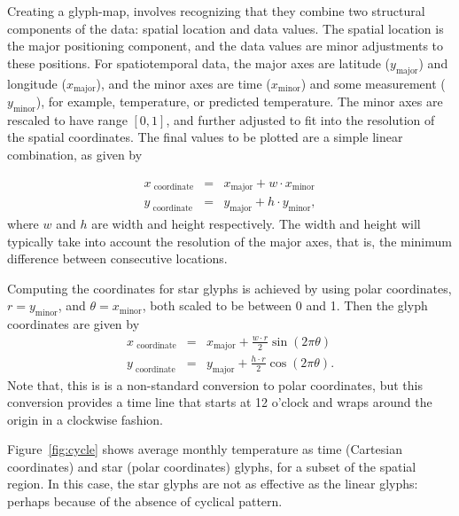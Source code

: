 \documentclass[oneside]{article}
\newcommand\amin{\text{minor}}
\newcommand\amaj{\text{major}}
\begin{document}
Creating a glyph-map, involves recognizing that they combine two structural components of the data: spatial location and data values. The spatial location is the major positioning component, and the data values are minor adjustments to these positions. For spatiotemporal data, the major axes are latitude ($y_{\amaj}$) and longitude ($x_{\amaj}$), and the minor axes are time ($x_{\amin}$) and some measurement ($y_{\amin}$), for example, temperature, or predicted temperature. The minor axes are rescaled to have range $[0, 1]$, and further adjusted to fit into the resolution of the spatial coordinates. The final values to be plotted are a simple linear combination, as given by 

\begin{equation}
\begin{array}{lll}
x_\text{ coordinate}&=& x_{\amaj} + w \cdot x_{\amin}\\
y_\text{ coordinate}&=& y_{\amaj} + h \cdot y_{\amin}, 
\end{array}\label{coords.eqn}
\end{equation}
where $w$ and $h$ are width and height respectively. The width and height will typically take into account the resolution of the major axes, that is, the minimum difference between consecutive locations.

Computing the coordinates for star glyphs is achieved by using polar coordinates,  $r=y_{\amin}$, and $\theta=x_{\amin}$, both scaled to be between 0 and 1. Then the glyph coordinates are given by 
\begin{equation}
\begin{array}{lll}
x_\text{ coordinate}&=& x_{\amaj} + \frac{w \cdot r}{2} \sin(2 \pi \theta) \\
y_\text{ coordinate}&=& y_{\amaj} + \frac{h \cdot r}{2} \cos(2 \pi \theta).
\end{array}\label{coords.polar.eqn}
\end{equation}
Note that, this is is a non-standard conversion to polar coordinates, but this conversion provides a time line that starts at 12 o'clock and wraps around the origin in a clockwise fashion.

Figure~\ref{fig:cycle} shows average monthly temperature as time (Cartesian coordinates) and star (polar coordinates) glyphs, for a subset of the spatial region. In this case, the star glyphs are not as effective as the linear glyphs: perhaps because of the absence of cyclical pattern.
\end{document}
